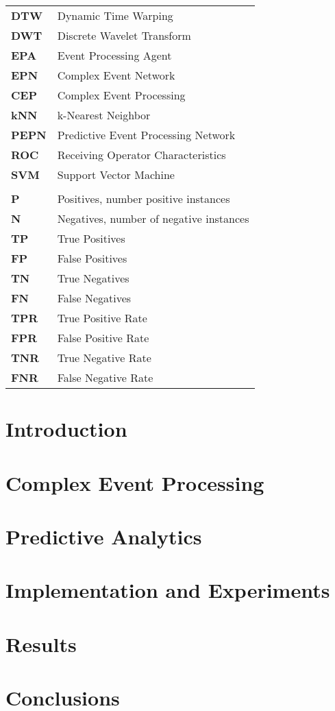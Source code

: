\documentclass[english,12pt,a4paper,pdftex]{report}
\begin{document}
\begin{tabular}{ll}
\textbf{DTW} & Dynamic Time Warping \\
\textbf{DWT} & Discrete Wavelet Transform \\
\textbf{EPA} & Event Processing Agent \\
\textbf{EPN} & Complex Event Network \\
\textbf{CEP} & Complex Event Processing \\
\textbf{kNN} & k-Nearest Neighbor \\
\textbf{PEPN} & Predictive Event Processing Network \\
\textbf{ROC} & Receiving Operator Characteristics \\
\textbf{SVM} & Support Vector Machine \\
\\
\textbf{P} & Positives, number positive instances \\
\textbf{N} & Negatives, number of negative instances  \\
\textbf{TP} & True Positives \\
\textbf{FP} & False Positives \\
\textbf{TN} & True Negatives \\
\textbf{FN} & False Negatives \\
\textbf{TPR} & True Positive Rate \\
\textbf{FPR} & False Positive Rate \\
\textbf{TNR} & True Negative Rate \\
\textbf{FNR} & False Negative Rate
\end{tabular}


\cleardoublepage
\storeinipagenumber
{}
\setcounter{page}{1}


\chapter{Introduction}

\clearpage

\chapter{Complex Event Processing}

\clearpage

\chapter{Predictive Analytics}

\clearpage

\chapter{Implementation and Experiments}

\clearpage

\chapter{Results}

\clearpage

\chapter{Conclusions} 


\clearpage




\clearpage

\end{document}
